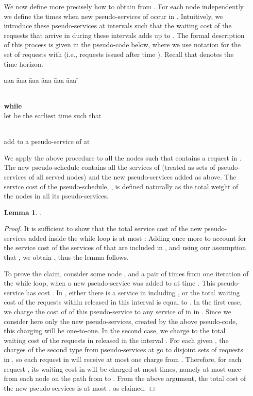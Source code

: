 \documentclass[a4paper]{article}
\newtheorem{lemma}[theorem]{Lemma}
\begin{document}
We now define more precisely how to obtain  from .
For each node  independently we define the times when new
pseudo-services of  occur in . Intuitively, we introduce
these pseudo-services at intervals such that the waiting cost
of the requests that arrive in  during these intervals adds
up to .  The formal description of this process is given in
the pseudo-code below, where we use notation  for the set of
requests  with  (i.e., requests issued after
time ). Recall that  denotes the time horizon.

\begin{tabbing}
aaa \= aaa \= aaa \= aaa \= aaa \= aaa \= \kill
\>

\\
\> \textbf{while} 
\\
\> \>
let  be the earliest time such that

\\
\> \>
add to  a pseudo-service of  at  
\\
\> \>
 
\end{tabbing}

We apply the above procedure to all the nodes 
such that  contains a request in . The new
pseudo-schedule  contains all the services of
 (treated as sets of pseudo-services of all served nodes)
and the new pseudo-services added as above.  The service cost of the
pseudo-schedule, , is defined naturally as the
total weight of the nodes in all its pseudo-services.


\begin{lemma}\label{lem: bound on pseudo sched}
.
\end{lemma}

\begin{proof}
It is sufficient to show that the total service cost of the new
pseudo-services added inside the while loop is at most
: Adding
 once more to account for the service cost of the
services of  that are included in , and
using our assumption that , we obtain , thus the lemma follows.

To prove the claim, consider some node , and a pair of times
 from one iteration of the while loop, when a new
pseudo-service was added to  at time .  This
pseudo-service has cost .  In , either there is
a service in  including , or the total waiting cost of the
requests within  released in this interval is equal to
.  In the first case, we
charge the cost of  of this pseudo-service to any service
of  in  in .  Since we consider here only the
new pseudo-services, created by the above pseudo-code, this charging
will be one-to-one.  In the second case, we charge  to the
total waiting cost of the requests in  released in the
interval .  For each given , the charges of the second
type from pseudo-services at  go to disjoint sets of requests in
, so each request in  will receive at most one
charge from .  Therefore, for each request , its waiting cost
in  will be charged at most  times, namely at most once
from each node  on the path from  to .  From the
above argument, the total cost of the new pseudo-services is at most
, as claimed.
\end{proof}
\end{document}
